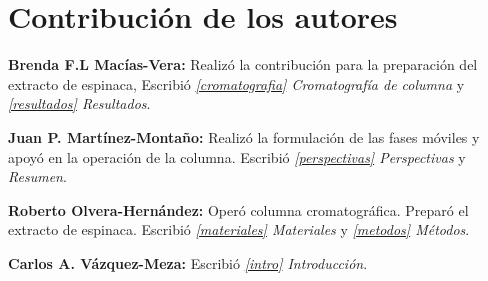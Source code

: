 \documentclass{ITESO-Report}
\begin{document}
\section{Contribución de los autores}
{\color{darkgray}\bfseries Brenda F.L Macías-Vera:}\hspace{1em}
Realizó la contribución para la preparación del extracto de espinaca, Escribió \textit{\ref{cromatografia} Cromatografía de columna} y \textit{\ref{resultados} Resultados}.

{\color{darkgray}\bfseries Juan P. Martínez-Montaño:}\hspace{1em}
Realizó la formulación de las fases móviles y apoyó en la operación de la columna. Escribió \textit{\ref{perspectivas} Perspectivas} y \textit{Resumen}.

{\color{darkgray}\bfseries Roberto Olvera-Hernández:}\hspace{1em}
Operó columna cromatográfica. Preparó el extracto de espinaca. Escribió \textit{\ref{materiales} Materiales} y \textit{\ref{metodos} Métodos}.

{\color{darkgray}\bfseries Carlos A. Vázquez-Meza:}\hspace{1em}
Escribió \textit{\ref{intro} Introducción}.

\printbibliography[title=Referencias citadas]
\end{document}

